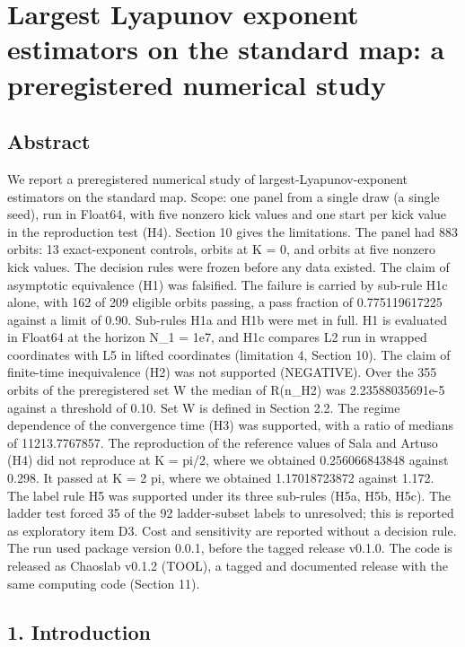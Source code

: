 \documentclass[
  11pt,
]{article}
\author{}
\date{}
\begin{document}
\section{Largest Lyapunov exponent estimators on the standard map: a
preregistered numerical
study}\label{largest-lyapunov-exponent-estimators-on-the-standard-map-a-preregistered-numerical-study}

\subsection{Abstract}\label{abstract}

We report a preregistered numerical study of largest-Lyapunov-exponent
estimators on the standard map. Scope: one panel from a single draw (a
single seed), run in Float64, with five nonzero kick values and one
start per kick value in the reproduction test (H4). Section 10 gives the
limitations. The panel had 883 orbits: 13 exact-exponent controls,
orbits at K = 0, and orbits at five nonzero kick values. The decision
rules were frozen before any data existed. The claim of asymptotic
equivalence (H1) was falsified. The failure is carried by sub-rule H1c
alone, with 162 of 209 eligible orbits passing, a pass fraction of
0.775119617225 against a limit of 0.90. Sub-rules H1a and H1b were met
in full. H1 is evaluated in Float64 at the horizon N\_1 = 1e7, and H1c
compares L2 run in wrapped coordinates with L5 in lifted coordinates
(limitation 4, Section 10). The claim of finite-time inequivalence (H2)
was not supported (NEGATIVE). Over the 355 orbits of the preregistered
set W the median of R(n\_H2) was 2.23588035691e-5 against a threshold of
0.10. Set W is defined in Section 2.2. The regime dependence of the
convergence time (H3) was supported, with a ratio of medians of
11213.7767857. The reproduction of the reference values of Sala and
Artuso \citep{SalaArtuso2015} (H4) did not reproduce at K = pi/2, where
we obtained 0.256066843848 against 0.298. It passed at K = 2 pi, where
we obtained 1.17018723872 against 1.172. The label rule H5 was supported
under its three sub-rules (H5a, H5b, H5c). The ladder test forced 35 of
the 92 ladder-subset labels to unresolved; this is reported as
exploratory item D3. Cost and sensitivity are reported without a
decision rule. The run used package version 0.0.1, before the tagged
release v0.1.0. The code is released as Chaoslab v0.1.2 (TOOL), a tagged
and documented release with the same computing code (Section 11).

\subsection{1. Introduction}\label{introduction}
\end{document}
